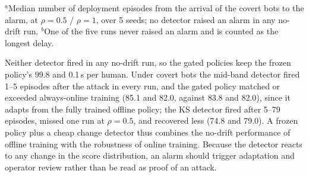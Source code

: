 \documentclass{ieeetj}
\begin{document}
\begin{table}[!t]
\caption{Gated Online Training. DI on the Evaluation Block, Mean $\pm$ SD over 5 Training Seeds, with Friction (Seconds of Challenge per Human) in Parentheses}
\label{tab:gated}
\centering
\footnotesize
\setlength{\tabcolsep}{4pt}

\vspace{2pt}
{\scriptsize $^a$Median number of deployment episodes from the arrival of the covert bots to the alarm, at $\rho=0.5$ / $\rho=1$, over 5 seeds; no detector raised an alarm in any no-drift run. $^b$One of the five runs never raised an alarm and is counted as the longest delay.}
\end{table}

Neither detector fired in any no-drift run, so the gated policies keep the frozen policy's 99.8 and 0.1\,s per human. Under covert bots the mid-band detector fired 1--5 episodes after the attack in every run, and the gated policy matched or exceeded always-online training (85.1 and 82.0, against 83.8 and 82.0), since it adapts from the fully trained offline policy; the KS detector fired after 5--79 episodes, missed one run at $\rho=0.5$, and recovered less (74.8 and 79.0). A frozen policy plus a cheap change detector thus combines the no-drift performance of offline training with the robustness of online training. Because the detector reacts to any change in the score distribution, an alarm should trigger adaptation and operator review rather than be read as proof of an attack.
\end{document}
